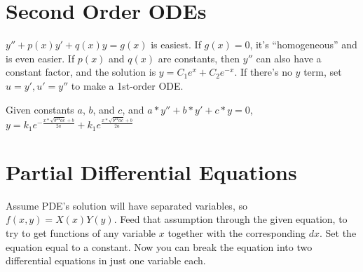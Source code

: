 \section{Second Order ODEs}

$ y'' + p(x)y' + q(x)y = g(x) $ is easiest. If $g(x) = 0$, it's
``homogeneous'' and is even easier. If $p(x)$ and $q(x)$ are
constants, then $y''$ can also have a constant factor, and the
solution is $ y = C_1e^x + C_2e^{-x} $. If there's no $y$ term, set
$u = y', u' = y''$ to make a 1st-order ODE.

Given constants $a$, $b$, and $c$, and $ a*y'' + b*y'+ c*y = 0 $,
$ y = k_1e^{-\frac{x*\sqrt{b^24ac}+b}{2a}} + k_1e^{\frac{x*\sqrt{b^24ac}+b}{2a}} $

\section{Partial Differential Equations}

Assume PDE's solution will have separated variables, so $ f(x, y) =
X(x)Y(y) $. Feed that assumption through the given equation, to try to
get functions of any variable $x$ together with the corresponding
$dx$. Set the equation equal to a constant. Now you can break the
equation into two differential equations in just one variable each.
